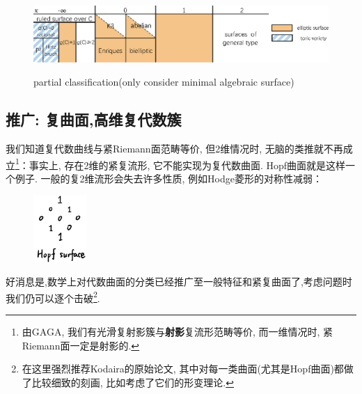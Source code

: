 \documentclass[UTF8,12pt,twoside]{article}
\theoremstyle{definition}
\numberwithin{equation}{section}
\begin{document}
\begin{center}
	\begin{figure}[ht]
		\vspace{0cm}
		\centering
		\includegraphics[width=13cm]{9-7-fig/table.eps}
		\label{fig:enrique}
		\captionsetup{labelformat=empty}
		\caption{partial classification(only consider minimal algebraic surface)}
	\end{figure}
\end{center}

\subsection{推广: 复曲面,高维复代数簇}

我们知道复代数曲线与紧Riemann面范畴等价, 但2维情况时, 无脑的类推就不再成立\footnote{由GAGA\cite{serre1956geometrie}, 我们有光滑复射影簇与\textbf{射影}复流形范畴等价, 而一维情况时, 紧Riemann面一定是射影的.}：事实上, 存在2维的紧复流形, 它不能实现为复代数曲面. Hopf曲面就是这样一个例子. 一般的复2维流形会失去许多性质, 例如Hodge菱形的对称性减弱：
\begin{center}
	\begin{figure}[ht]
		\vspace{0cm}
		\centering
		\includegraphics[width=2cm]{9-7-fig/hodgeofhopf.png}
		\label{fig:hodgeofhopf}
	\end{figure}
\end{center}


好消息是,数学上对代数曲面的分类已经推广至一般特征和紧复曲面了,考虑问题时我们仍可以逐个击破\footnote{在这里强烈推荐Kodaira的原始论文\cite{kodaira1964structure,kodaira1966structure,kodaira1968compact,kodaira1968structure}, 其中对每一类曲面(尤其是Hopf曲面)都做了比较细致的刻画, 比如考虑了它们的形变理论.}. 
\end{document}
